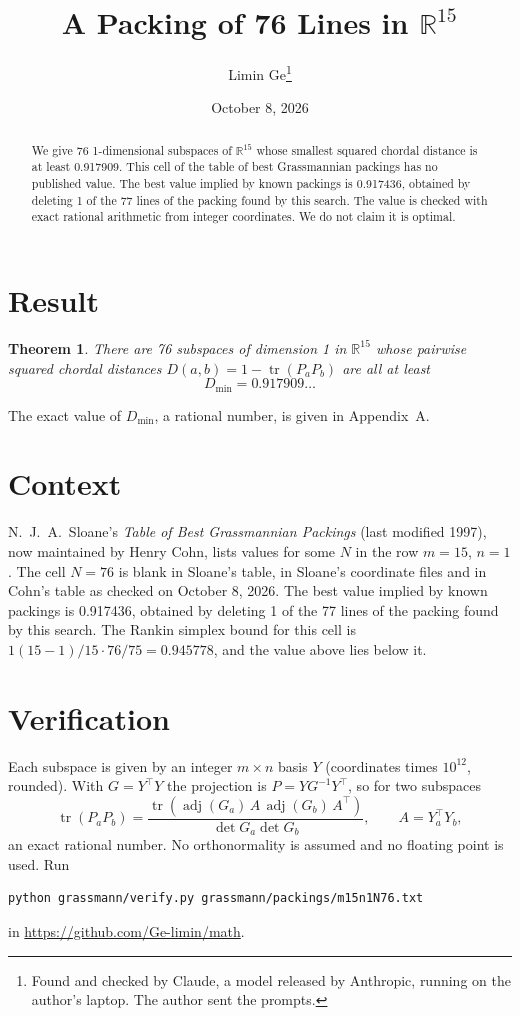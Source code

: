 \documentclass[11pt,a4paper]{article}
\title{A Packing of 76 Lines in $\mathbb{R}^{15}$}
\author{Limin Ge\thanks{Found and checked by Claude, a model released by Anthropic, running on the author's laptop. The author sent the prompts.}}
\date{October 8, 2026}
\newtheorem*{theorem}{Theorem}
\begin{document}
\maketitle
\begin{abstract}
We give 76 1-dimensional subspaces of $\mathbb{R}^{15}$ whose smallest squared chordal distance is at least 0.917909. This cell of the table of best Grassmannian packings has no published value. The best value implied by known packings is 0.917436, obtained by deleting 1 of the 77 lines of the packing found by this search. The value is checked with exact rational arithmetic from integer coordinates. We do not claim it is optimal.
\end{abstract}

\section{Result}
\begin{theorem}
There are 76 subspaces of dimension 1 in $\mathbb{R}^{15}$ whose pairwise squared chordal distances $D(a,b) = 1 - \operatorname{tr}(P_aP_b)$ are all at least
\[ D_{\min} = 0.917909\ldots \]
\end{theorem}
The exact value of $D_{\min}$, a rational number, is given in Appendix~A.


\section{Context}
N.~J.~A.~Sloane's \emph{Table of Best Grassmannian Packings} (last modified 1997), now maintained by Henry Cohn, lists values for some $N$ in the row $m=15$, $n=1$. The cell $N=76$ is blank in Sloane's table, in Sloane's coordinate files and in Cohn's table as checked on October 8, 2026. The best value implied by known packings is 0.917436, obtained by deleting 1 of the 77 lines of the packing found by this search. The Rankin simplex bound for this cell is $1(15-1)/15\cdot 76/75 = 0.945778$, and the value above lies below it.


\section{Verification}
Each subspace is given by an integer $m\times n$ basis $Y$ (coordinates times $10^{12}$, rounded). With $G=Y^\top Y$ the projection is $P=YG^{-1}Y^\top$, so for two subspaces
\[ \operatorname{tr}(P_aP_b)=\frac{\operatorname{tr}(\operatorname{adj}(G_a)\,A\,\operatorname{adj}(G_b)\,A^\top)}{\det G_a\det G_b},\qquad A=Y_a^\top Y_b, \]
an exact rational number. No orthonormality is assumed and no floating point is used. Run
\begin{verbatim}
python grassmann/verify.py grassmann/packings/m15n1N76.txt
\end{verbatim}
in \url{https://github.com/Ge-limin/math}.
\end{document}
